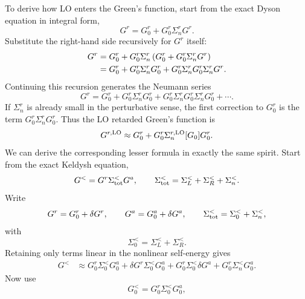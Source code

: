 To derive how LO enters the Green's function, start from the exact Dyson equation in integral form,
\begin{equation}
    G^r = G_0^r + G_0^r\Sigma_n^r G^r.
    \label{eq:dyson_integral_for_LO_derivation}
\end{equation}
Substitute the right-hand side recursively for $G^r$ itself:
\begin{align}
    G^r
    &= G_0^r + G_0^r\Sigma_n^r\left( G_0^r + G_0^r\Sigma_n^r G^r \right) \\
    &= G_0^r + G_0^r\Sigma_n^r G_0^r + G_0^r\Sigma_n^r G_0^r\Sigma_n^r G^r.
\end{align}
Continuing this recursion generates the Neumann series
\begin{equation}
    G^r = G_0^r + G_0^r\Sigma_n^r G_0^r + G_0^r\Sigma_n^r G_0^r\Sigma_n^r G_0^r + \cdots.
    \label{eq:dyson_neumann_series_again}
\end{equation}
If $\Sigma_n^r$ is already small in the perturbative sense, the first correction to $G_0^r$ is the term $G_0^r\Sigma_n^r G_0^r$. Thus the LO retarded Green's function is
\begin{equation}
    G^{r,\rm LO}
    \approx
    G_0^r + G_0^r\Sigma_n^{r,\rm LO}[G_0]G_0^r.
    \label{eq:LO_retarded_from_neumann}
\end{equation}
We can derive the corresponding lesser formula in exactly the same spirit. Start from the exact Keldysh equation,
\begin{equation}
    G^< = G^r\Sigma_{\rm tot}^< G^a,
    \qquad
    \Sigma_{\rm tot}^< = \Sigma_L^< + \Sigma_R^< + \Sigma_n^<.
    \label{eq:exact_keldysh_for_LO_derivation}
\end{equation}
Write
\begin{equation}
    G^r = G_0^r + \delta G^r,
    \qquad
    G^a = G_0^a + \delta G^a,
    \qquad
    \Sigma_{\rm tot}^< = \Sigma_0^< + \Sigma_n^<,
\end{equation}
with
\begin{equation}
    \Sigma_0^< = \Sigma_L^< + \Sigma_R^<.
\end{equation}
Retaining only terms linear in the nonlinear self-energy gives
\begin{align}
    G^<
    &\approx
    G_0^r\Sigma_0^<G_0^a
    + \delta G^r\Sigma_0^<G_0^a
    + G_0^r\Sigma_0^<\delta G^a
    + G_0^r\Sigma_n^<G_0^a.
\end{align}
Now use
\begin{equation}
    G_0^< = G_0^r\Sigma_0^<G_0^a,
\end{equation}

